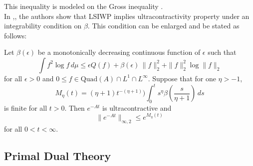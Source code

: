 This inequality is modeled on the Gross inequality \cite{}.
\\

In \cite{ds},\cite{d}, the authors show that LSIWP implies
ultracontractivity property  under an integrability condition on
$\beta$. This condition can be enlarged and be stated as follows:

\begin{thm}
Let ${\beta}(\epsilon)$ be a monotonically decreasing continuous
function of $\epsilon$
such that
\begin{equation}\label{vareps}
\int f^2\log f \, d{\mu}\leq
\epsilon Q(f) +{\beta}(\epsilon)\, \|f\|^2_2 + \|f\|^2_2\log \|f\|_2
\end{equation}
for all $\epsilon >0$ and $0\leq f\in \mbox{Quad}(A)\cap L^1\cap
L^{\infty}$. Suppose that
for one ${\eta}>-1$,
\begin{equation}\label{integral}
M_{\eta}(t)=({\eta}+1)t^{-({\eta}+1)})\int_0^t
{s}^{\eta}{\beta}\left(\frac{s}{\eta+1}\right)
\,ds
 \end{equation}
is finite for  all $t>0$. Then $e^{-At}$ is ultracontractive
and
\begin{equation}\label{majo}
\| e^{-At} \|_{\infty,2}\leq e^{M_{\eta}(t)}
\end{equation}
for all $0<t<\infty$.
\end{thm}


\subsection{Primal Dual Theory}
 \cite{Chapelle07traininga}



%
%
